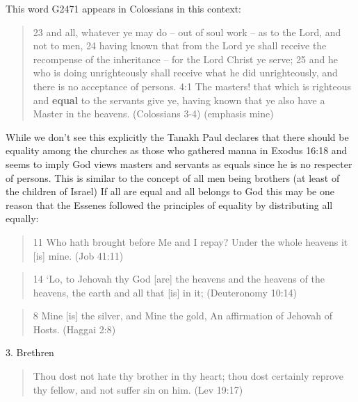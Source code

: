 \documentclass[11pt]{article}
\begin{document}
This word G2471 appears in Colossians in this context:
\begin{quote}
23 and all, whatever ye may do -- out of soul work -- as to the Lord, and not to men,
24 having known that from the Lord ye shall receive the recompense of the inheritance -- for the Lord Christ ye serve;
25 and he who is doing unrighteously shall receive what he did unrighteously, and there is no acceptance of persons.
4:1 The masters! that which is righteous and \textbf{equal} to the servants give ye, having known that ye also have a Master in the heavens.
(Colossians 3-4) (emphasis mine)
\end{quote} 
While we don't see this explicitly the Tanakh Paul declares that there should be equality among the churches as those who gathered manna in Exodus 16:18 and seems to imply God views masters and servants as equals since he is no respecter of persons. This is similar to the concept of all men being brothers (at least of the children of Israel) If all are equal and all belongs to God this may be one reason that the Essenes followed the principles of equality by distributing all equally:
\begin{quote}
11 Who hath brought before Me and I repay? Under the whole heavens it [is] mine. (Job 41:11)
\end{quote}
\begin{quote}
14 `Lo, to Jehovah thy God [are] the heavens and the heavens of the heavens, the earth and all that [is] in it; (Deuteronomy 10:14)
\end{quote}
\begin{quote}
8 Mine [is] the silver, and Mine the gold, An affirmation of Jehovah of Hosts.
(Haggai 2:8)
\end{quote}


3. Brethren
\begin{quote}
Thou dost not hate thy brother in thy heart; thou dost certainly reprove thy fellow, and not suffer sin on him. (Lev 19:17)
\end{quote}
\end{document}
